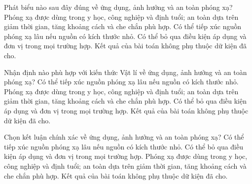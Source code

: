 \begin{ex}
Phát biểu nào sau đây đúng về ứng dụng, ảnh hưởng và an toàn phóng xạ?
\choice
{\True Phóng xạ được dùng trong y học, công nghiệp và định tuổi; an toàn dựa trên giảm thời gian, tăng khoảng cách và che chắn phù hợp.}
{Có thể tiếp xúc nguồn phóng xạ lâu nếu nguồn có kích thước nhỏ.}
{Có thể bỏ qua điều kiện áp dụng và đơn vị trong mọi trường hợp.}
{Kết quả của bài toán không phụ thuộc dữ kiện đã cho.}
\end{ex}

\begin{ex}
Nhận định nào phù hợp với kiến thức Vật lí về ứng dụng, ảnh hưởng và an toàn phóng xạ?
\choice
{Có thể tiếp xúc nguồn phóng xạ lâu nếu nguồn có kích thước nhỏ.}
{\True Phóng xạ được dùng trong y học, công nghiệp và định tuổi; an toàn dựa trên giảm thời gian, tăng khoảng cách và che chắn phù hợp.}
{Có thể bỏ qua điều kiện áp dụng và đơn vị trong mọi trường hợp.}
{Kết quả của bài toán không phụ thuộc dữ kiện đã cho.}
\end{ex}

\begin{ex}
Chọn kết luận chính xác về ứng dụng, ảnh hưởng và an toàn phóng xạ?
\choice
{Có thể tiếp xúc nguồn phóng xạ lâu nếu nguồn có kích thước nhỏ.}
{Có thể bỏ qua điều kiện áp dụng và đơn vị trong mọi trường hợp.}
{\True Phóng xạ được dùng trong y học, công nghiệp và định tuổi; an toàn dựa trên giảm thời gian, tăng khoảng cách và che chắn phù hợp.}
{Kết quả của bài toán không phụ thuộc dữ kiện đã cho.}
\end{ex}

